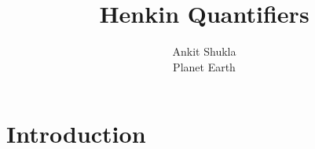 \documentclass[draft]{llncs}
\begin{document}
\title{Henkin Quantifiers}

\author{
    Ankit Shukla\\
	Planet Earth
}



\maketitle

\begin{abstract}

\end{abstract}

\section{Introduction}
\label{sec:intro}


%
%

\appendix
\clearpage
\end{document}
